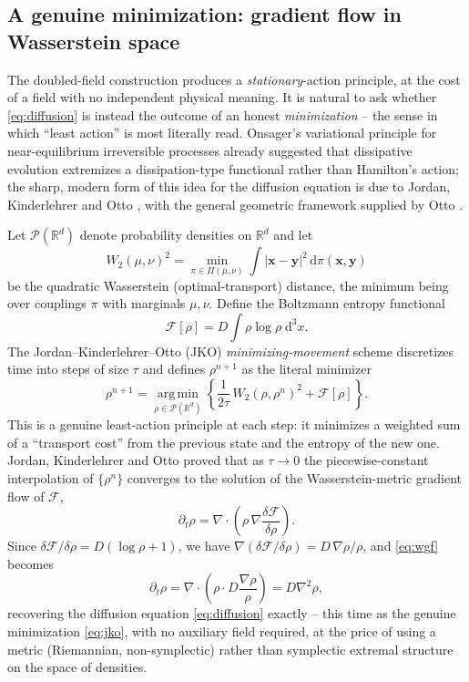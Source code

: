 \documentclass[11pt]{article}
\newcommand{\rd}{\mathrm{d}}
\newcommand{\lap}{\nabla^2}
\newcommand{\bx}{\mathbf{x}}
\newcommand{\by}{\mathbf{y}}
\begin{document}
\subsection{A genuine minimization: gradient flow in Wasserstein space}
\label{sec:jko}

The doubled-field construction produces a \emph{stationary}-action principle, at the cost of a field with no independent physical meaning. It is natural to ask whether \eqref{eq:diffusion} is instead the outcome of an honest \emph{minimization} -- the sense in which ``least action'' is most literally read. Onsager's variational principle for near-equilibrium irreversible processes \cite{Onsager1931I,Onsager1931II} already suggested that dissipative evolution extremizes a dissipation-type functional rather than Hamilton's action; the sharp, modern form of this idea for the diffusion equation is due to Jordan, Kinderlehrer and Otto \cite{JordanKinderlehrerOtto1998}, with the general geometric framework supplied by Otto \cite{Otto2001}.

Let $\mathcal P(\mathbb R^d)$ denote probability densities on $\mathbb R^d$ and let
\begin{equation}
W_2(\mu,\nu)^2 = \min_{\pi\in\Pi(\mu,\nu)} \int |\bx-\by|^2\,\rd\pi(\bx,\by)
\end{equation}
be the quadratic Wasserstein (optimal-transport) distance, the minimum being over couplings $\pi$ with marginals $\mu,\nu$. Define the Boltzmann entropy functional
\begin{equation}
\mathcal F[\rho] = D\int \rho\log\rho\;\rd^3x.
\end{equation}
The Jordan--Kinderlehrer--Otto (JKO) \emph{minimizing-movement} scheme discretizes time into steps of size $\tau$ and defines $\rho^{n+1}$ as the literal minimizer
\begin{equation}
\rho^{n+1} = \operatorname*{arg\,min}_{\rho\in\mathcal P(\mathbb R^d)} \left\{\frac{1}{2\tau}\,W_2(\rho,\rho^n)^2 + \mathcal F[\rho]\right\}. \label{eq:jko}
\end{equation}
This is a genuine least-action principle at each step: it minimizes a weighted sum of a ``transport cost'' from the previous state and the entropy of the new one. Jordan, Kinderlehrer and Otto proved \cite{JordanKinderlehrerOtto1998} that as $\tau\to 0$ the piecewise-constant interpolation of $\{\rho^n\}$ converges to the solution of the Wasserstein-metric gradient flow of $\mathcal F$,
\begin{equation}
\partial_t \rho = \nabla\cdot\left(\rho\,\nabla\frac{\delta \mathcal F}{\delta\rho}\right). \label{eq:wgf}
\end{equation}
Since $\delta\mathcal F/\delta\rho = D(\log\rho + 1)$, we have $\nabla(\delta\mathcal F/\delta\rho) = D\,\nabla\rho/\rho$, and \eqref{eq:wgf} becomes
\begin{equation}
\partial_t\rho = \nabla\cdot\left(\rho\cdot D\frac{\nabla\rho}{\rho}\right) = D\lap\rho,
\end{equation}
recovering the diffusion equation \eqref{eq:diffusion} exactly -- this time as the genuine minimization \eqref{eq:jko}, with no auxiliary field required, at the price of using a metric (Riemannian, non-symplectic) rather than symplectic extremal structure on the space of densities.
\end{document}
